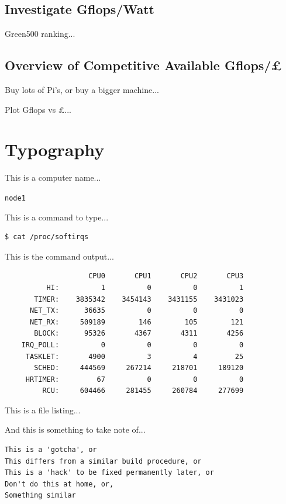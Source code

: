 \documentclass{report}
\begin{document}
\subsection{Investigate Gflops/Watt}

Green500 ranking...



\subsection{Overview of Competitive Available Gflops/£}

Buy lots of Pi's, or buy a bigger machine...

Plot Gflops vs £...


%
%
\section{Typography}

This is a computer name...

\verb|node1|

This is a command to type...

\lstset{style=termstyle}
\begin{lstlisting}[]
$ cat /proc/softirqs
\end{lstlisting}

This is the command output...

\lstset{style=termstyle}
\begin{lstlisting}
                    CPU0       CPU1       CPU2       CPU3       
          HI:          1          0          0          1
       TIMER:    3835342    3454143    3431155    3431023
      NET_TX:      36635          0          0          0
      NET_RX:     509189        146        105        121
       BLOCK:      95326       4367       4311       4256
    IRQ_POLL:          0          0          0          0
     TASKLET:       4900          3          4         25
       SCHED:     444569     267214     218701     189120
     HRTIMER:         67          0          0          0
         RCU:     604466     281455     260784     277699
\end{lstlisting}

This is a file listing...

\lstset{style=listingstyle}



And this is something to take note of...

\lstset{style=hack}
\begin{lstlisting}
This is a 'gotcha', or
This differs from a similar build procedure, or
This is a 'hack' to be fixed permanently later, or
Don't do this at home, or,
Something similar
\end{lstlisting}
\end{document}
